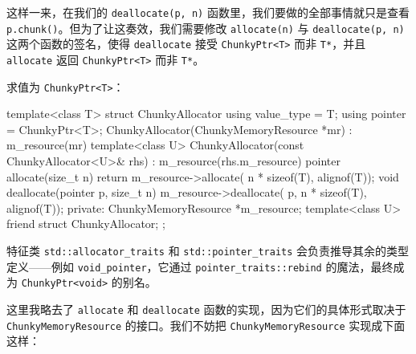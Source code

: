 这样一来，在我们的 \texttt{deallocate(\allowbreak{}p,\allowbreak{} n)\allowbreak{}} 函数里，我们要做的全部事情就只是查看 \texttt{p.\allowbreak{}chunk(\allowbreak{})\allowbreak{}}。但为了让这奏效，我们需要修改 \texttt{allocate(\allowbreak{}n)\allowbreak{}} 与 \texttt{deallocate(\allowbreak{}p,\allowbreak{} n)\allowbreak{}} 这两个函数的签名，使得 \texttt{deallocate} 接受 \texttt{Chunky\allowbreak{}Ptr<\allowbreak{}T>\allowbreak{}} 而非 \texttt{T*}，并且 \texttt{allocate} 返回 \texttt{Chunky\allowbreak{}Ptr<\allowbreak{}T>\allowbreak{}} 而非 \texttt{T*}。

求值为 \texttt{Chunky\allowbreak{}Ptr<\allowbreak{}T>\allowbreak{}}：

\begin{codebox}[cpp]
    template<class T>
    struct ChunkyAllocator {
      using value_type = T;
      using pointer = ChunkyPtr<T>;
      ChunkyAllocator(ChunkyMemoryResource *mr) :
        m_resource(mr) {}
      template<class U>
      ChunkyAllocator(const ChunkyAllocator<U>& rhs) :
        m_resource(rhs.m_resource) {}
      pointer allocate(size_t n) {
        return m_resource->allocate(
          n * sizeof(T), alignof(T));
      }
      void deallocate(pointer p, size_t n) {
        m_resource->deallocate(
          p, n * sizeof(T), alignof(T));
      }
    private:
      ChunkyMemoryResource *m_resource;
      template<class U>
      friend struct ChunkyAllocator;
    };
\end{codebox}

特征类 \texttt{std::\allowbreak{}allocator\_\allowbreak{}traits} 和 \texttt{std::\allowbreak{}pointer\_\allowbreak{}traits} 会负责推导其余的类型定义——例如 \texttt{void\_\allowbreak{}pointer}，它通过 \texttt{pointer\_\allowbreak{}traits::\allowbreak{}rebind} 的魔法，最终成为 \texttt{Chunky\allowbreak{}Ptr<\allowbreak{}void>\allowbreak{}} 的别名。

这里我略去了 \texttt{allocate} 和 \texttt{deallocate} 函数的实现，因为它们的具体形式取决于 \texttt{Chunky\allowbreak{}Memory\allowbreak{}Resource} 的接口。我们不妨把 \texttt{Chunky\allowbreak{}Memory\allowbreak{}Resource} 实现成下面这样：

